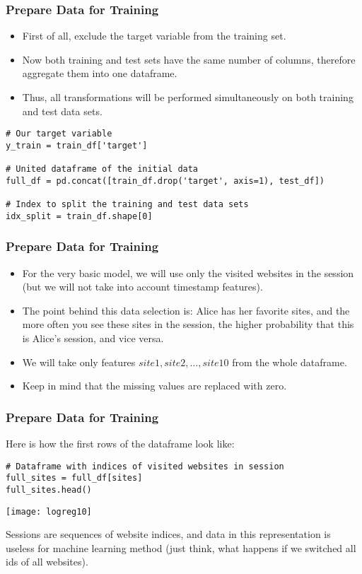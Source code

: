 \begin{frame}[fragile]\frametitle{Prepare Data for Training}	
\begin{itemize}
\item First of all, exclude the target variable from the training set. 
\item Now both training and test sets have the same number of columns, therefore aggregate them into one dataframe. 
\item Thus, all transformations will be performed simultaneously on both training and test data sets.
\end{itemize}
\begin{lstlisting}
# Our target variable
y_train = train_df['target']

# United dataframe of the initial data 
full_df = pd.concat([train_df.drop('target', axis=1), test_df])

# Index to split the training and test data sets
idx_split = train_df.shape[0]
\end{lstlisting}
\end{frame}

\begin{frame}[fragile]\frametitle{Prepare Data for Training}	
\begin{itemize}
\item For the very basic model, we will use only the visited websites in the session (but we will not take into account timestamp features). 
\item The point behind this data selection is: Alice has her favorite sites, and the more often you see these sites in the session, the higher probability that this is Alice's session, and vice versa.
\item We will take only features $site1, site2, \ldots , site10$ from the whole dataframe. 
\item Keep in mind that the missing values are replaced with zero.
\end{itemize}
\end{frame}

\begin{frame}[fragile]\frametitle{Prepare Data for Training}	
Here is how the first rows of the dataframe look like:
\begin{lstlisting}
# Dataframe with indices of visited websites in session
full_sites = full_df[sites]
full_sites.head()
\end{lstlisting}

\begin{center}
\texttt{[image: logreg10]}
\end{center}

Sessions are sequences of website indices, and data in this representation is useless for machine learning method (just think, what happens if we switched all ids of all websites).
\end{frame}


